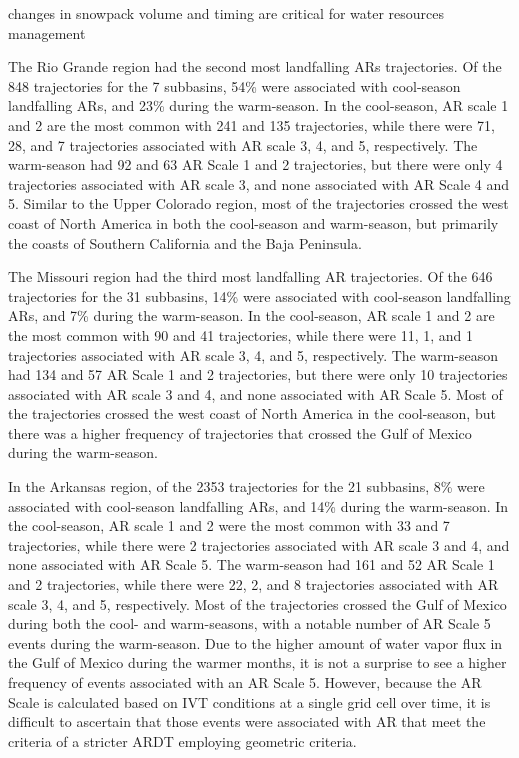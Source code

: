 \documentclass[draft]{agujournal2019}
\begin{document}
changes in snowpack volume and timing are critical for water resources management

The Rio Grande region had the second most landfalling ARs trajectories. Of the 848 trajectories for the 7 subbasins, 54\% were associated with cool-season landfalling ARs, and 23\% during the warm-season. In the cool-season, AR scale 1 and 2 are the most common with 241 and 135 trajectories, while there were 71, 28, and 7 trajectories associated with AR scale 3, 4, and 5, respectively. The warm-season had 92 and 63 AR Scale 1 and 2 trajectories, but there were only 4 trajectories associated with AR scale 3, and none associated with AR Scale 4 and 5. Similar to the Upper Colorado region, most of the trajectories crossed the west coast of North America in both the cool-season and warm-season, but primarily the coasts of Southern California and the Baja Peninsula. 

The Missouri region had the third most landfalling AR trajectories. Of the 646 trajectories for the 31 subbasins, 14\% were associated with cool-season landfalling ARs, and 7\% during the warm-season. In the cool-season, AR scale 1 and 2 are the most common with 90 and 41 trajectories, while there were 11, 1, and 1 trajectories associated with AR scale 3, 4, and 5, respectively. The warm-season had 134 and 57 AR Scale 1 and 2 trajectories, but there were only 10 trajectories associated with AR scale 3 and 4, and none associated with AR Scale 5. Most of the trajectories crossed the west coast of North America in the cool-season, but there was a higher frequency of trajectories that crossed the Gulf of Mexico during the warm-season.

In the Arkansas region, of the 2353 trajectories for the 21 subbasins, 8\% were associated with cool-season landfalling ARs, and 14\% during the warm-season. In the cool-season, AR scale 1 and 2 were the most common with 33 and 7 trajectories, while there were 2 trajectories associated with AR scale 3 and 4, and none associated with AR Scale 5. The warm-season had 161 and 52 AR Scale 1 and 2 trajectories, while there were 22, 2, and 8 trajectories associated with AR scale 3, 4, and 5, respectively. Most of the trajectories crossed the Gulf of Mexico during both the cool- and warm-seasons, with a notable number of AR Scale 5 events during the warm-season. Due to the higher amount of water vapor flux in the Gulf of Mexico during the warmer months, it is not a surprise to see a higher frequency of events associated with an AR Scale 5. However, because the AR Scale is calculated based on IVT conditions at a single grid cell over time, it is difficult to ascertain that those events were associated with AR that meet the criteria of a stricter ARDT employing geometric criteria.
\end{document}
